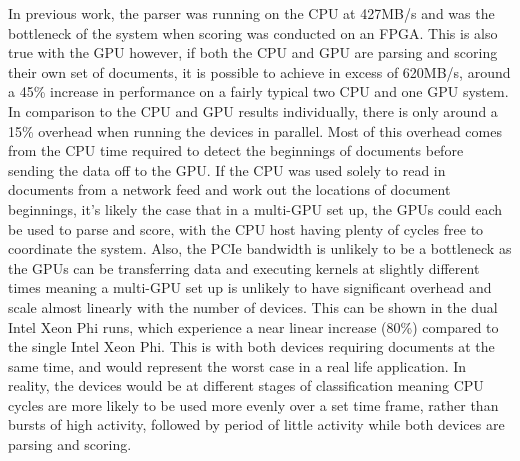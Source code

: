 In previous work, the parser was running on the CPU at 427MB/s
\cite{HybridCPUFPGA} and was the bottleneck of the system when scoring was
conducted on an FPGA. This is also true with the GPU however, if both the CPU
and GPU are parsing and scoring their own set of documents, it is possible to
achieve in excess of 620MB/s, around a 45\% increase in performance on a fairly
typical two CPU and one GPU system. In comparison to the CPU and GPU results
individually, there is only around a 15\% overhead when running the devices in
parallel. Most of this overhead comes from the CPU time required to detect the
beginnings of documents before sending the data off to the GPU. If the CPU was
used solely to read in documents from a network feed and work out the locations
of document beginnings, it's likely the case that in a multi-GPU set up, the
GPUs could each be used to parse and score, with the CPU host having plenty of
cycles free to coordinate the system. Also, the PCIe bandwidth is unlikely to be
a bottleneck as the GPUs can be transferring data and executing kernels at
slightly different times meaning a multi-GPU set up is unlikely to have
significant overhead and scale almost linearly with the number of devices. This
can be shown in the dual Intel Xeon Phi runs, which experience a near linear
increase (80\%) compared to the single Intel Xeon Phi. This is with both devices
requiring documents at the same time, and would represent the worst case in a
real life application. In reality, the devices would be at different stages of
classification meaning CPU cycles are more likely to be used more evenly over a
set time frame, rather than bursts of high activity, followed by period of
little activity while both devices are parsing and scoring.
